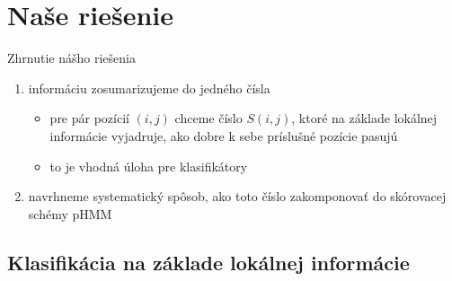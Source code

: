 \documentclass[xcolor=dvipsnames, compress, 12pt]{beamer}
\theoremstyle{definition}
\begin{document}
\section{Naše riešenie}
\begin{frame}{Zhrnutie nášho riešenia}
  \begin{enumerate}
    \item informáciu zosumarizujeme do jedného čísla
    \begin{itemize}
      \item pre pár pozícií $(i, j)$ chceme číslo $S(i, j)$, ktoré na základe lokálnej informácie vyjadruje, ako dobre k sebe príslušné pozície pasujú
      \item to je vhodná úloha pre klasifikátory
    \end{itemize}
    \item navrhneme systematický spôsob, ako toto číslo zakomponovať do skórovacej schémy pHMM
  \end{enumerate}
\end{frame}


\subsection{Klasifikácia na základe lokálnej informácie}
\end{document}

